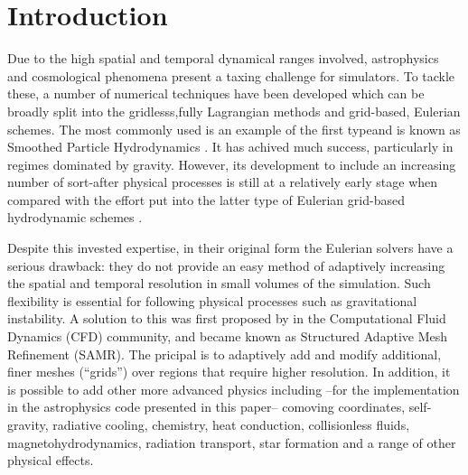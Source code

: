 
\section{Introduction}\label{sec.intro}

Due to the high spatial and temporal dynamical ranges involved, astrophysics and cosmological phenomena present a taxing challenge for simulators. To tackle these, a number of numerical techniques have been developed which can be broadly split into the gridlesss,fully Lagrangian methods and grid-based, Eulerian schemes. The most commonly used is an example of the first typeand is known as Smoothed Particle Hydrodynamics \citep[SPH;][]{Lucy77, SPH}. It has achived much success, particularly in regimes dominated by gravity.
However, its development to include an increasing number of sort-after physical processes is still at a relatively early stage when compared with the effort put into the latter type of Eulerian grid-based hydrodynamic schemes \citep[e.g.,][]{laney-1998, toro-1997, Woodward84}.

Despite this invested expertise, in their original form the Eulerian solvers have a serious drawback: they do not provide an easy method of adaptively increasing the spatial and temporal resolution in small volumes of the simulation. Such flexibility is essential for following physical processes such as gravitational instability. 
A solution to this was first proposed by \citet{Berger89} in the Computational Fluid Dynamics (CFD) community, and became known as Structured Adaptive Mesh Refinement (SAMR). The pricipal is to adaptively add and modify additional, finer meshes (``grids'') over regions that require higher resolution. In addition, it is possible to add other more advanced physics including --for the implementation in the astrophysics code presented in this paper-- comoving coordinates, self-gravity, radiative cooling, chemistry, heat conduction, collisionless fluids, magnetohydrodynamics, radiation transport, star formation and a range of other physical effects.

